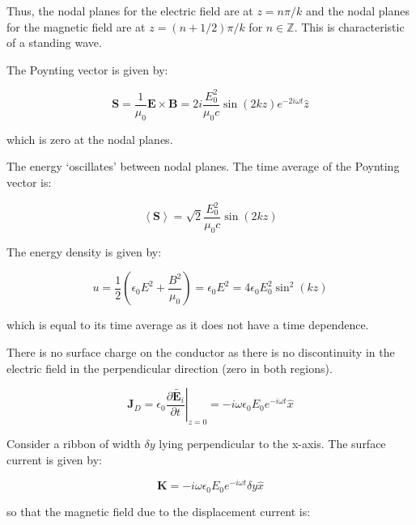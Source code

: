 \documentclass[12pt]{article}
\begin{document}
Thus, the nodal planes for the electric field are at $z = n\pi/k$ and the nodal planes for the magnetic field are at $z = (n+1/2)\pi/k$ for $n \in \mathbb{Z}$. This is characteristic of a standing wave.

The Poynting vector is given by:

\begin{equation}
    \mathbf{S} = \frac{1}{\mu_{0}} \mathbf{E} \times \mathbf{B} = 2i \frac{E_{0}^{2}}{\mu_{0}c} \sin{(2kz)} e^{-2i\omega t} \hat{z}
\end{equation}

which is zero at the nodal planes.

The energy `oscillates' between nodal planes. The time average of the Poynting vector is:

\begin{equation}
    \left\langle \mathbf{S} \right\rangle = \sqrt{2} \frac{E_{0}^{2}}{\mu_{0}c} \sin{(2kz)}
\end{equation}

The energy density is given by:

\begin{equation}
    u = \frac{1}{2} \left( \epsilon_{0} E^{2} + \frac{B^{2}}{\mu_{0}} \right) = \epsilon_{0} E^{2} = 4 \epsilon_{0} E_{0}^{2} \sin^{2}{(kz)}
\end{equation}

which is equal to its time average as it does not have a time dependence.

There is no surface charge on the conductor as there is no discontinuity in the electric field in the perpendicular direction (zero in both regions).


\begin{equation}
    \mathbf{J}_{D} = \left. \epsilon_{0} \frac{\partial \tilde{\mathbf{E}_{i}}}{\partial t} \right|_{z=0} = -i\omega \epsilon_{0} E_{0} e^{-i\omega t} \hat{x}
\end{equation}

Consider a ribbon of width $\delta y$ lying perpendicular to the x-axis. The surface current is given by:

\begin{equation}
    \mathbf{K} = -i\omega \epsilon_{0} E_{0} e^{-i\omega t} \delta y \hat{x}
\end{equation}

so that the magnetic field due to the displacement current is:
\end{document}
